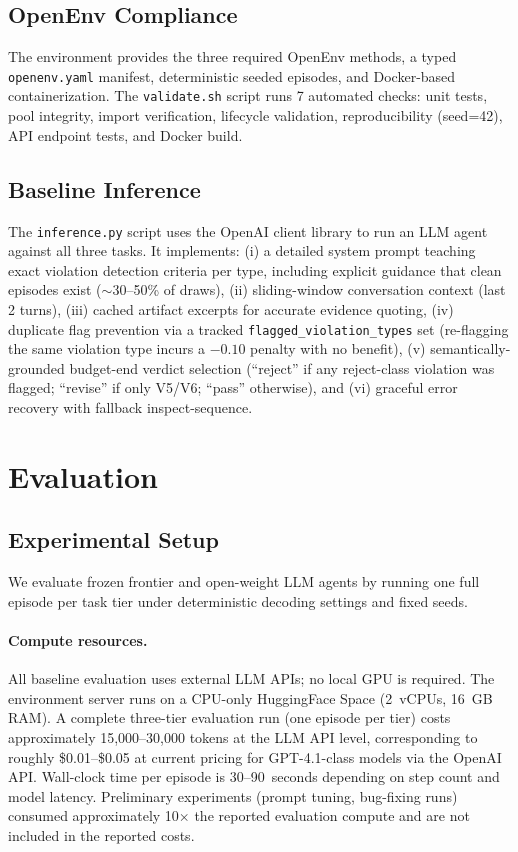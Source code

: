 \documentclass{article}
\begin{document}
\subsection{OpenEnv Compliance}

The environment provides the three required OpenEnv methods, a typed
\texttt{openenv.yaml} manifest, deterministic seeded episodes, and
Docker-based containerization.  The \texttt{validate.sh} script runs 7
automated checks: unit tests, pool integrity, import verification,
lifecycle validation, reproducibility (seed=42), API endpoint tests, and
Docker build.

\subsection{Baseline Inference}

The \texttt{inference.py} script uses the OpenAI client library to run
an LLM agent against all three tasks.  It implements:
(i) a detailed system prompt teaching exact violation detection criteria per type,
including explicit guidance that clean episodes exist ($\sim$30--50\% of draws),
(ii) sliding-window conversation context (last 2 turns),
(iii) cached artifact excerpts for accurate evidence quoting,
(iv) duplicate flag prevention via a tracked \texttt{flagged\_violation\_types} set
(re-flagging the same violation type incurs a $-0.10$ penalty with no benefit),
(v) semantically-grounded budget-end verdict selection (``reject'' if any
reject-class violation was flagged; ``revise'' if only V5/V6; ``pass'' otherwise),
and (vi) graceful error recovery with fallback inspect-sequence.

\section{Evaluation}
\label{sec:eval}

\subsection{Experimental Setup}

We evaluate frozen frontier and open-weight LLM agents by running one full episode per task tier under deterministic decoding settings and fixed seeds.

\paragraph{Compute resources.}
All baseline evaluation uses external LLM APIs; no local GPU is required.
The environment server runs on a CPU-only HuggingFace Space (2~vCPUs, 16~GB RAM).
A complete three-tier evaluation run (one episode per tier) costs approximately 15,000--30,000 tokens at the LLM API level, corresponding to roughly \$0.01--\$0.05 at current pricing for GPT-4.1-class models via the OpenAI API.
Wall-clock time per episode is 30--90~seconds depending on step count and model latency.
Preliminary experiments (prompt tuning, bug-fixing runs) consumed approximately 10$\times$ the reported evaluation compute and are not included in the reported costs.
\end{document}
